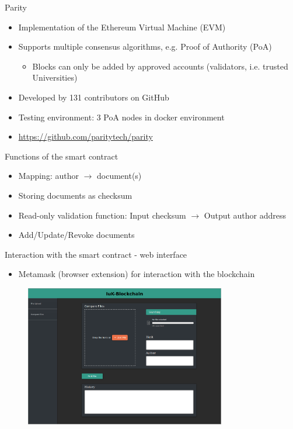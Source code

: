 \documentclass[10pt]{beamer}
\begin{document}
\begin{frame}{Parity}
	\begin{itemize}
		\item Implementation of the Ethereum Virtual Machine (EVM)
		\item Supports multiple consensus algorithms, e.g. Proof of Authority (PoA)
		\begin{itemize}
			\item Blocks can only be added by approved accounts (validators, i.e. trusted Universities)
		\end{itemize}
		\item Developed by 131 contributors on GitHub
		\item Testing environment: 3 PoA nodes in docker environment
		\item \url{https://github.com/paritytech/parity}
	\end{itemize}
\end{frame}

\begin{frame}{Functions of the smart contract}
	\begin{itemize}
		\item Mapping: author  $\rightarrow$ document(s)
		\item Storing documents as checksum
		\item Read-only validation function: Input checksum $\rightarrow$ Output author address
		\item Add/Update/Revoke documents
	\end{itemize}
\end{frame}

\begin{frame}{Interaction with the smart contract - web interface}
	\begin{itemize}
		\item Metamask (browser extension) for interaction with the blockchain
	\end{itemize}
	\begin{figure}
		\includegraphics[width=0.78\textwidth]{images/GUI-180603_1.png}
	\end{figure}
\end{frame}
\end{document}
